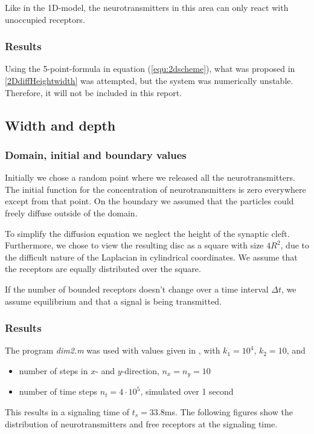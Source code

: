 Like in the 1D-model, the neurotransmitters in this area can only react with unoccupied receptors. 

\subsubsection{Results}
Using the 5-point-formula in equation (\ref{equ:2dscheme}), what was proposed in \ref{2DdiffHeightwidth} was attempted, but the system was numerically unstable. Therefore, it will not be included in this report. 


\subsection{Width and depth}

\subsubsection{Domain, initial and boundary values}

Initially we chose a random point where we released all the neurotransmitters. The initial function for the concentration of neurotransmitters is zero everywhere except from that point. On the boundary we assumed that the particles could freely diffuse outside of the domain.

To simplify the diffusion equation we neglect the height of the synaptic cleft. Furthermore, we chose to view the resulting disc as a square with size $4R^2$, due to the difficult nature of the Laplacian in cylindrical coordinates. We assume that the receptors are equally distributed over the square.

If the number of bounded receptors doesn't change over a time interval $\Delta t$, we assume equilibrium and that a signal is being transmitted. 



\subsubsection{Results}
The program \textit{dim2.m} was used with values given in \cite{task}, with $k_1=10^4$, $k_2=10$, and 
\begin{itemize}
\item number of steps in $x$- and $y$-direction, $n_x=n_y=10$
\item number of time steps $n_t=4\cdot 10^5$, simulated over 1 second
\end{itemize}
This results in a signaling time of $t_s=33.8$ms. The following figures show the distribution of neurotransmitters and free receptors at the signaling time. 


